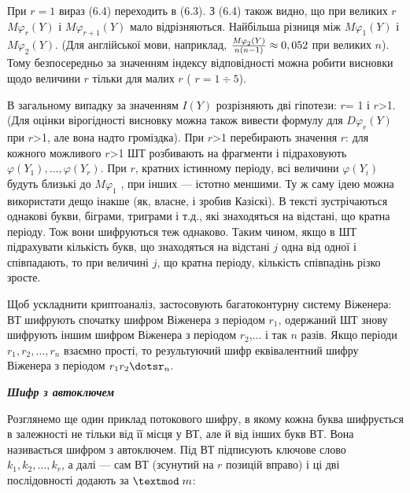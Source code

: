 При  $r=1$ вираз (6.4) переходить в (6.3). З (6.4) також видно, що при великих
 $r$  $\mathit{M\varphi }_r(Y)$ і  $\mathit{M\varphi }_{r+1}(Y)$
мало відрізняються. Найбільша різниця між  $\mathit{M\varphi }_1(Y)$ і 
$\mathit{M\varphi }_2(Y)$. (Для англійської мови, наприклад, 
$\frac{\mathit{M\varphi }_{2}(Y)}{n(n-1)}\approx 0,\text052$ при великих 
$n$). Тому безпосередньо за значенням індексу відповідності можна робити
висновки щодо величини  $r$ тільки для малих  $r$ ( $r=1\div 5$). 

В загальному випадку за значенням  $I(Y)$ розрізняють дві гіпотези:  $r$= 1
і  $r${\textgreater}1. (Для оцінки вірогідності висновку можна також вивести
формулу для  $\mathit{D\varphi }_r(Y)$ при  $r${\textgreater}1, але
вона надто громіздка). При  $r${\textgreater}1 перебирають значення  $r$:
для кожного можливого  $r${\textgreater}1 ШТ розбивають на фрагменти і
підраховують  $\varphi (Y_{1}),\dots,\varphi (Y_r)$.
При  $r$, кратних істинному періоду, всі величини  $\varphi (Y_i)$
будуть близькі до  $\mathit{M\varphi }_1$ , при інших --- істотно меншими.
Ту ж саму ідею можна використати дещо інакше (як, власне, і зробив Казіскі). В
тексті зустрічаються однакові букви, біграми, триграми і т.д., які знаходяться
на відстані, що кратна періоду. Тож вони шифруються теж однаково. Таким чином,
якщо в ШТ підрахувати кількість букв, що знаходяться на відстані  $j$ одна
від одної і співпадають, то при величині  $j$, що кратна періоду, кількість
співпадінь різко зросте.

Щоб ускладнити криптоаналіз, застосовують багатоконтурну систему Віженера: ВТ
шифрують спочатку шифром Віженера з періодом  $r_1$, одержаний ШТ знову
шифрують іншим шифром Віженера з періодом  $r_2$,... і так  $n$ разів.
Якщо періоди  $r_{1},r_{2},\dots,r_n$ взаємно
прості, то результуючий шифр еквівалентний шифру Віженера з періодом 
$r_{1}r_{2}\dotsr_n$. 


\bigskip


\bigskip

{\centering\bfseries\itshape
Шифр з автоключем
\par}


\bigskip


\bigskip

Розглянемо ще один приклад потокового шифру, в якому кожна буква шифрується в
залежності не тільки від її місця у ВТ, але й від інших букв ВТ. Вона
називається шифром з автоключем. Під ВТ підписують ключове слово 
$k_{1},k_{2},\dots,k_r$, а далі --- сам ВТ (зсунутий
на  $r$ позицій вправо) і ці дві послідовності додають за  $\textmod\;m$:


